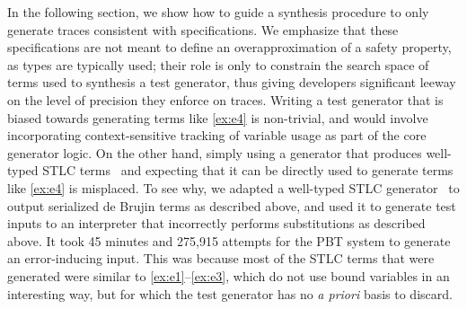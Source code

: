 In the following section, we show how to guide a synthesis procedure
to only generate traces consistent with \tyName{} specifications.  We
emphasize that these specifications are not meant to define an
overapproximation of a safety property, as types are typically used;
their role is only to constrain the search space of terms used to
synthesis a test generator, thus giving developers significant leeway
on the level of precision they enforce on traces.  Writing a test
generator that is biased towards generating terms like \ref{ex:e4} is
non-trivial, and would involve incorporating context-sensitive
tracking of variable usage as part of the core generator logic.  On
the other hand, simply using a generator that produces well-typed STLC
terms~\cite{BeginnerLuck,CoverageType,FQL24} and expecting that it can
be directly used to generate terms like \ref{ex:e4} is misplaced.  To
see why, we adapted a well-typed STLC generator~\cite{CoverageType} to
output serialized de Brujin terms as described above, and used it to
generate test inputs to an interpreter that incorrectly performs
substitutions as described above. It took 45 minutes and 275,915
attempts for the PBT system to generate an error-inducing input.  This
was because most of the STLC terms that were generated were similar to
\ref{ex:e1}--\ref{ex:e3}, which do not use bound variables in an
interesting way, but for which the test generator has no \emph{a
  priori} basis to discard.







